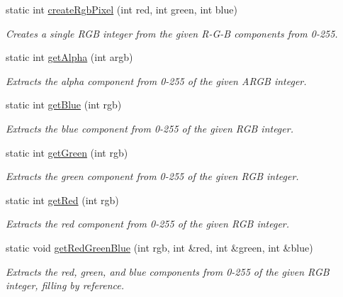 \begin{DoxyCompactItemize}
\item 
static int \mbox{\hyperlink{classGCanvas_a10beefcf8631433d0cdddefd4e24c76a}{create\+Rgb\+Pixel}} (int red, int green, int blue)
\begin{DoxyCompactList}\small\item\em Creates a single R\+GB integer from the given R-\/\+G-\/B components from 0-\/255. \end{DoxyCompactList}\item 
static int \mbox{\hyperlink{classGCanvas_a48d898ddf58651669b5f33240a65096f}{get\+Alpha}} (int argb)
\begin{DoxyCompactList}\small\item\em Extracts the alpha component from 0-\/255 of the given A\+R\+GB integer. \end{DoxyCompactList}\item 
static int \mbox{\hyperlink{classGCanvas_a9406c01e6961257db37b5dc95945f914}{get\+Blue}} (int rgb)
\begin{DoxyCompactList}\small\item\em Extracts the blue component from 0-\/255 of the given R\+GB integer. \end{DoxyCompactList}\item 
static int \mbox{\hyperlink{classGCanvas_ac307c120ba81c4531d46924ba3358382}{get\+Green}} (int rgb)
\begin{DoxyCompactList}\small\item\em Extracts the green component from 0-\/255 of the given R\+GB integer. \end{DoxyCompactList}\item 
static int \mbox{\hyperlink{classGCanvas_adef2eb72dada1f3c3ef5079705cd278a}{get\+Red}} (int rgb)
\begin{DoxyCompactList}\small\item\em Extracts the red component from 0-\/255 of the given R\+GB integer. \end{DoxyCompactList}\item 
static void \mbox{\hyperlink{classGCanvas_ab13dd3d16d2b7bd90fbf9595df9cf2b7}{get\+Red\+Green\+Blue}} (int rgb, int \&red, int \&green, int \&blue)
\begin{DoxyCompactList}\small\item\em Extracts the red, green, and blue components from 0-\/255 of the given R\+GB integer, filling by reference. \end{DoxyCompactList}\end{DoxyCompactItemize}
